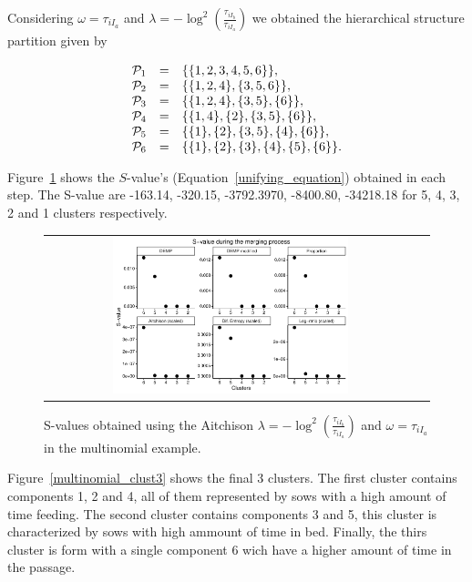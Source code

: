 \documentclass[10pt, a4paper]{article}
\theoremstyle{definition}
\begin{document}
\begin{spacing}{1.9}
Considering $\omega = \tau_{i I_a}$ and $\lambda = -\log^2 \left(\frac{ \tau_{iI_b} }{ \tau_{iI_a} }\right)$ we obtained the hierarchical structure partition given by


\begin{equation}
\begin{array}{r c l}
\mathcal{P}_1 &=& \{\{1,2,3,4,5,6\}\}, \\ 
\mathcal{P}_2 &=& \{\{1,2,4\},\{3,5,6\}\}, \\ 
\mathcal{P}_3 &=& \{\{1,2,4\},\{3,5\},\{6\}\}, \\ 
\mathcal{P}_4 &=& \{\{1,4\},\{2\},\{3,5\},\{6\}\}, \\ 
\mathcal{P}_5 &=& \{\{1\},\{2\},\{3,5\},\{4\},\{6\}\}, \\ 
\mathcal{P}_6 &=& \{\{1\},\{2\},\{3\},\{4\},\{5\},\{6\} \}.
\end{array}
\label{hier_ex_multinomial}
\end{equation}

Figure~\ref{multinomial_Svalues} shows the $S$-value's (Equation~\ref{unifying_equation}) obtained in each step. The S-value are -163.14,   -320.15,  -3792.3970,  -8400.80, -34218.18 for 5, 4, 3, 2 and 1 clusters respectively.

\begin{figure}[t]
\begin{center}
\begin{tabular}{cc}
  \includegraphics[width=0.65\textwidth]{figures/multinomial_Svalues_all.pdf} \\
 \end{tabular}
 \caption{S-values obtained using the Aitchison $\lambda = -\log^2 \left(\frac{ \tau_{iI_b} }{ \tau_{iI_a} }\right)$ and $\omega = \tau_{i I_a}$ in the multinomial example.}\label{multinomial_Svalues}
\end{center}
\end{figure}

Figure~\ref{multinomial_clust3} shows the final 3 clusters. The first cluster contains components 1, 2 and 4, all of them represented by sows with a high amount of time feeding. The second cluster contains components 3 and 5, this cluster is characterized by sows with high ammount of time in bed. Finally, the thirs cluster is form with a single component 6 wich have a higher amount of time in the passage.


\end{spacing}
\end{document}
